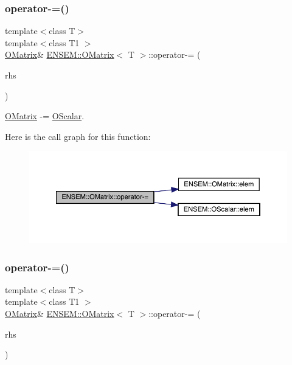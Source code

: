 \subsubsection{\texorpdfstring{operator-\/=()}{operator-=()}\hspace{0.1cm}{\footnotesize\ttfamily [3/4]}}
{\footnotesize\ttfamily template$<$class T$>$ \\
template$<$class T1 $>$ \\
\mbox{\hyperlink{classENSEM_1_1OMatrix}{O\+Matrix}}\& \mbox{\hyperlink{classENSEM_1_1OMatrix}{E\+N\+S\+E\+M\+::\+O\+Matrix}}$<$ T $>$\+::operator-\/= (\begin{DoxyParamCaption}\item[{const \mbox{\hyperlink{classENSEM_1_1OScalar}{O\+Scalar}}$<$ T1 $>$ \&}]{rhs }\end{DoxyParamCaption})\hspace{0.3cm}{\ttfamily [inline]}}



\mbox{\hyperlink{classENSEM_1_1OMatrix}{O\+Matrix}} -\/= \mbox{\hyperlink{classENSEM_1_1OScalar}{O\+Scalar}}. 

Here is the call graph for this function\+:
\nopagebreak
\begin{figure}[H]
\begin{center}
\leavevmode
\includegraphics[width=350pt]{dd/d80/classENSEM_1_1OMatrix_a53a1a690a2f39f0c64c6d261efc00e4c_cgraph}
\end{center}
\end{figure}
\mbox{\label{classENSEM_1_1OMatrix_a53a1a690a2f39f0c64c6d261efc00e4c}} 
\subsubsection{\texorpdfstring{operator-\/=()}{operator-=()}\hspace{0.1cm}{\footnotesize\ttfamily [4/4]}}
{\footnotesize\ttfamily template$<$class T$>$ \\
template$<$class T1 $>$ \\
\mbox{\hyperlink{classENSEM_1_1OMatrix}{O\+Matrix}}\& \mbox{\hyperlink{classENSEM_1_1OMatrix}{E\+N\+S\+E\+M\+::\+O\+Matrix}}$<$ T $>$\+::operator-\/= (\begin{DoxyParamCaption}\item[{const \mbox{\hyperlink{classENSEM_1_1OScalar}{O\+Scalar}}$<$ T1 $>$ \&}]{rhs }\end{DoxyParamCaption})\hspace{0.3cm}{\ttfamily [inline]}}



